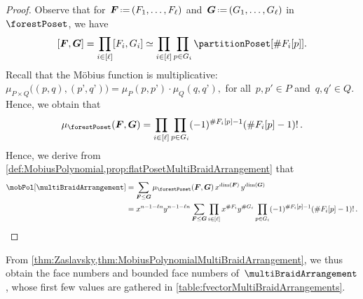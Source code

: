 \documentclass{amsart}
\theoremstyle{definition}
\renewcommand{\b}[1]{{\boldsymbol{#1}}} %
\newcommand{\eqdef}{\mbox{\,\raisebox{0.2ex}{\scriptsize\ensuremath{\mathrm:}}\ensuremath{=}\,}} %
\renewcommand{\b}[1]{\boldsymbol{#1}} %
\begin{document}
\begin{proof}
Observe that for~$\b{F} \eqdef (F_1, \dots, F_\ell)$ and~$\b{G} \eqdef (G_1, \dots, G_\ell)$ in~$\forestPoset$, we have
\[
[\b{F}, \b{G}] = \prod_{i \in [\ell]} [F_i, G_i] \simeq \prod_{i \in [\ell]} \prod_{p \in G_i} \partitionPoset[{\#F_i[p]}].
\]
Recall that the M\"obius function is multiplicative:
\(
\mu_{P \times Q} \big( (p,q), (p’,q’) \big) = \mu_P(p,p’) \cdot \mu_Q(q,q’),
\)
for all~$p, p' \in P$ and~$q, q' \in Q$.
Hence, we obtain that
\[
\mu_{\forestPoset}(\b{F}, \b{G}) = \prod_{i \in [\ell]} \prod_{p \in G_i} (-1)^{\#F_i[p]-1} (\# F_i[p]-1)! \, .
\]
Hence, we derive from \cref{def:MobiusPolynomial,prop:flatPosetMultiBraidArrangement} that
\begin{align*}
\mobPol[\multiBraidArrangement] 
& = \sum_{\b{F} \le \b{G}} \mu_{\forestPoset}(\b{F}, \b{G}) \, x^{\dim(\b{F})} \, y^{\dim(\b{G})} \\
& = x^{n-1-\ell n} y^{n-1-\ell n} \sum_{\b{F} \le \b{G}} \prod_{i \in [\ell]} x^{\#F_i} y^{\#G_i} \prod_{p \in G_i} (-1)^{\#F_i[p]-1} (\# F_i[p]-1)! \, .
\qedhere
\end{align*}
\end{proof}

From \cref{thm:Zaslavsky,thm:MobiusPolynomialMultiBraidArrangement}, we thus obtain the face numbers and bounded face numbers of~$\multiBraidArrangement$, whose first few values are gathered in \cref{table:fvectorMultiBraidArrangements}.
\end{document}
